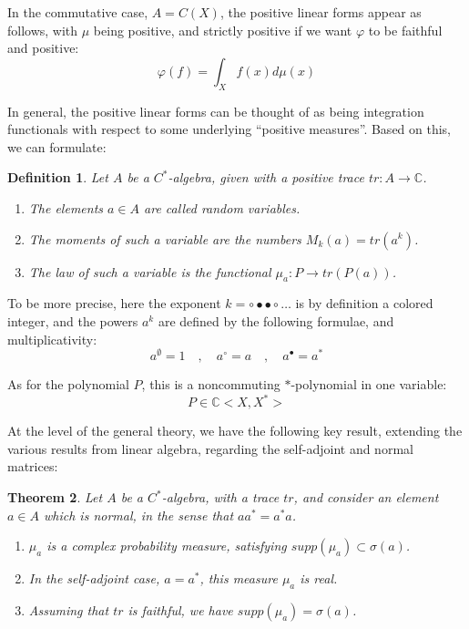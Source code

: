 \documentclass[12pt]{amsbook}
\newtheorem{theorem}{Theorem}[chapter]
\newtheorem{definition}[theorem]{Definition}
\begin{document}
In the commutative case, $A=C(X)$, the positive linear forms appear as follows, with $\mu$ being positive, and strictly positive if we want $\varphi$ to be faithful and positive:
$$\varphi(f)=\int_Xf(x)d\mu(x)$$

In general, the positive linear forms can be thought of as being integration functionals with respect to some underlying ``positive measures''. Based on this, we can formulate:


\begin{definition}
Let $A$ be a $C^*$-algebra, given with a positive trace $tr:A\to\mathbb C$.
\begin{enumerate}
\item The elements $a\in A$ are called random variables.

\item The moments of such a variable are the numbers $M_k(a)=tr(a^k)$.

\item The law of such a variable is the functional $\mu_a:P\to tr(P(a))$.
\end{enumerate}
\end{definition}

To be more precise, here the exponent $k=\circ\bullet\bullet\circ\ldots$ is by definition a colored integer, and the powers $a^k$ are defined by the following formulae, and multiplicativity: 
$$a^\emptyset=1\quad,\quad
a^\circ=a\quad,\quad
a^\bullet=a^*$$ 

As for the polynomial $P$, this is a noncommuting $*$-polynomial in one variable: 
$$P\in\mathbb C<X,X^*>$$

At the level of the general theory, we have the following key result, extending the various results from linear algebra, regarding the self-adjoint and normal matrices:


\begin{theorem}
Let $A$ be a $C^*$-algebra, with a trace $tr$, and consider an element $a\in A$ which is normal, in the sense that $aa^*=a^*a$.
\begin{enumerate}
\item $\mu_a$ is a complex probability measure, satisfying $supp(\mu_a)\subset\sigma(a)$.

\item In the self-adjoint case, $a=a^*$, this measure $\mu_a$ is real.

\item Assuming that $tr$ is faithful, we have $supp(\mu_a)=\sigma(a)$.
\end{enumerate}
\end{theorem}
\end{document}
